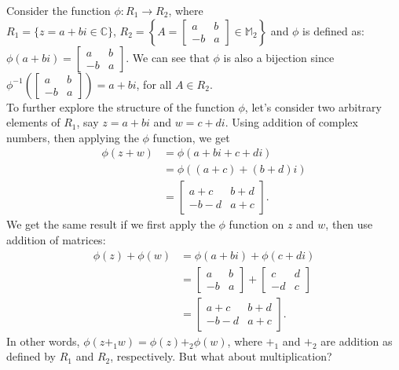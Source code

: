\begin{example}\label{example:rings:phi_matrix}
Consider the function $\phi:R_1\rightarrow R_2$, where\\
$R_1=\{z=a+bi\in{\mathbb C}\}$, $R_2=\left\{A=
\begin{bmatrix}
a & b\\
-b & a
\end{bmatrix}\in{\mathbb M}_2\right\}$ and $\phi$ is defined as:
$\phi(a+bi)=
\begin{bmatrix}
a & b\\
-b & a
\end{bmatrix}$.
We can see that $\phi$ is also a bijection since $\phi^{-1}\left(
\begin{bmatrix}
a & b\\
-b & a
\end{bmatrix}\right)
=a+bi$, for all
$A\in R_2$.\\

To further explore the structure of the function $\phi$, let's consider two arbitrary elements of $R_1$, say $z=a+bi$ and $w=c+di$.  Using addition of complex numbers, then applying the $\phi$ function, we get
\begin{align*}
\phi(z+w)&=\phi(a+bi+c+di)\\
&=\phi((a+c)+(b+d)i)\\
&=
\begin{bmatrix}
a+c & b+d\\
-b-d & a+c
\end{bmatrix}.
\end{align*}
We get the same result if we first apply the $\phi$ function on $z$ and $w$, then use addition of matrices:
\begin{align*}
\phi(z)+\phi(w)&=\phi(a+bi)+\phi(c+di)\\
&=
\begin{bmatrix}
a & b\\
-b & a
\end{bmatrix}+
\begin{bmatrix}
c & d\\
-d & c
\end{bmatrix}\\
&=
\begin{bmatrix}
a+c & b+d\\
-b-d & a+c
\end{bmatrix}.
\end{align*}
In other words, $\phi(z+_1w)=\phi(z)+_2\phi(w)$, where $+_1$ and $+_2$ are addition as defined by $R_1$ and $R_2$, respectively.  But what about multiplication?


\end{example}

